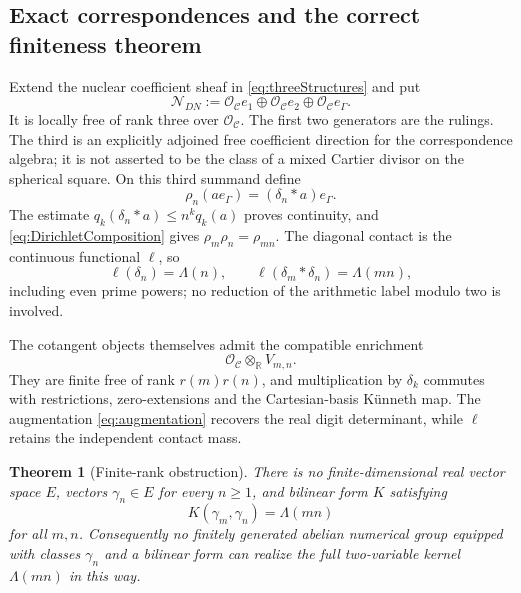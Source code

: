 \documentclass[11pt]{amsart}
\newtheorem{theorem}{Theorem}[section]
\theoremstyle{definition}
\theoremstyle{remark}
\newcommand{\R}{\mathbb R}
\begin{document}
\subsection{Exact correspondences and the correct finiteness theorem}

Extend the nuclear coefficient sheaf in \eqref{eq:threeStructures} and put
\begin{equation}\label{eq:NDN}
 \mathcal N_{DN}:=
 \mathcal O_{\mathcal C}e_1\oplus
 \mathcal O_{\mathcal C}e_2\oplus
 \mathcal O_{\mathcal C}e_\Gamma.
\end{equation}
It is locally free of rank three over $\mathcal O_{\mathcal C}$.  The first
two generators are the rulings.  The third is an explicitly adjoined free
coefficient direction for the correspondence algebra; it is not asserted
to be the class of a mixed Cartier divisor on the spherical square.  On
this third summand define
\begin{equation}\label{eq:nuclearAction}
 \rho_n(ae_\Gamma)=(\delta_n*a)e_\Gamma.
\end{equation}
The estimate $q_k(\delta_n*a)\leq n^kq_k(a)$ proves continuity, and
\eqref{eq:DirichletComposition} gives
$\rho_m\rho_n=\rho_{mn}$.  The diagonal contact is the continuous functional
$\ell$, so
\begin{equation}\label{eq:nuclearExactContact}
 \ell(\delta_n)=\Lambda(n),\qquad
 \ell(\delta_m*\delta_n)=\Lambda(mn),
\end{equation}
including even prime powers; no
reduction of the arithmetic label modulo two is involved.

The cotangent objects themselves admit the compatible enrichment
\[
 \mathcal O_{\mathcal C}\otimes_{\R}V_{m,n}.
\]
They are finite free of rank $r(m)r(n)$, and multiplication by $\delta_k$
commutes with restrictions, zero-extensions and the Cartesian-basis
K\"unneth map.  The augmentation \eqref{eq:augmentation} recovers the real
digit determinant, while $\ell$ retains the independent contact mass.

\begin{theorem}[Finite-rank obstruction]\label{thm:finiteNSnogo}
There is no finite-dimensional real vector space $E$, vectors
$\gamma_n\in E$ for every $n\geq1$, and bilinear form $K$ satisfying
\begin{equation}\label{eq:finiteRankImpossible}
 K(\gamma_m,\gamma_n)=\Lambda(mn)
\end{equation}
for all $m,n$.  Consequently no finitely generated abelian numerical group
equipped with classes $\gamma_n$ and a bilinear form can realize the full
two-variable kernel $\Lambda(mn)$ in this way.
\end{theorem}
\end{document}
